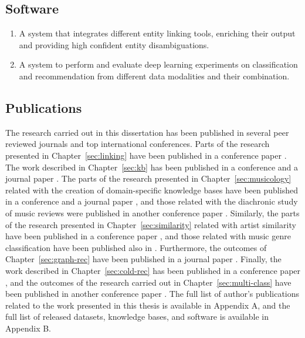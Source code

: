 \subsection{Software}

\begin{enumerate}
\item
A system that integrates different entity linking tools, enriching their output and providing high confident entity disambiguations.

\item
A system to perform and evaluate deep learning experiments on classification and recommendation from different data modalities and their combination. %

\end{enumerate}

\subsection{Publications}
\label{sec:conclusion:publications}

The research carried out in this dissertation has been published in several peer reviewed journals and top international conferences. Parts of the research presented in Chapter~\ref{sec:linking} have been published in a conference paper \citep{Oramas2016}. The work described in Chapter~\ref{sec:kb} has been published in a conference and a journal paper \citep{Oramas2015,Oramas2016a}. The parts of the research presented in Chapter~\ref{sec:musicology} related with the creation of domain-specific knowledge bases have been published in a conference and a journal paper \citep{Oramas2015b,oramas2016knowledge}, and those related with the diachronic study of music reviews were published in another conference paper \citep{oramas2016exploring}. Similarly, the parts of the research presented in Chapter~\ref{sec:similarity} related with artist similarity have been published in a conference paper \citep{Oramas2015a}, and those related with music genre classification have been published also in \cite{oramas2016exploring}. Furthermore, the outcomes of Chapter~\ref{sec:graph-rec} have been published in a journal paper \citep{oramas2016sound}. Finally, the work described in Chapter~\ref{sec:cold-rec} has been published in a conference paper \citep{oramas2017deep}, and the outcomes of the research carried out in Chapter~\ref{sec:multi-class} have been published in another conference paper \citep{oramas2017multi}. The full list of author's publications related to the work presented in this thesis is available in Appendix A, and the full list of released datasets, knowledge bases, and software is available in Appendix B.


